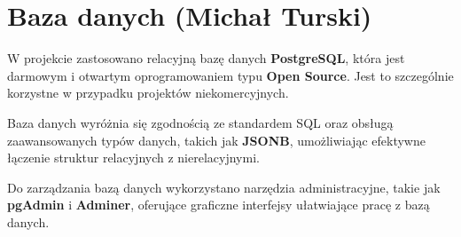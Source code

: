 \section{Baza danych (Michał Turski)}

W projekcie zastosowano relacyjną bazę danych \textbf{PostgreSQL}, która jest darmowym i otwartym oprogramowaniem typu \textbf{Open Source}. Jest to szczególnie korzystne w przypadku projektów niekomercyjnych.

Baza danych wyróżnia się zgodnością ze standardem SQL oraz obsługą zaawansowanych typów danych, takich jak \textbf{JSONB}, umożliwiając efektywne łączenie struktur relacyjnych z nierelacyjnymi.

Do zarządzania bazą danych wykorzystano narzędzia administracyjne, takie jak \textbf{pgAdmin} i \textbf{Adminer}, oferujące graficzne interfejsy ułatwiające pracę z bazą danych.
